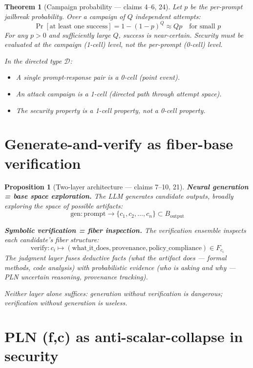 \documentclass[11pt,a4paper]{article}
\newtheorem{theorem}[definition]{Theorem}
\newtheorem{proposition}[definition]{Proposition}
\begin{document}
\begin{theorem}[Campaign probability --- claims 4--6, 24]
\label{thm:campaign}
Let $p$ be the per-prompt jailbreak probability. Over a campaign of $Q$
independent attempts:
\[
  \Pr[\text{at least one success}] = 1 - (1-p)^Q \approx Qp
  \quad \text{for small } p
\]
For any $p > 0$ and sufficiently large $Q$, success is near-certain.
Security must be evaluated at the campaign (1-cell) level, not the
per-prompt (0-cell) level.

In the directed type $\mathcal{D}$:
\begin{itemize}
  \item A single prompt-response pair is a 0-cell (point event).
  \item An attack campaign is a 1-cell (directed path through attempt space).
  \item The security property is a 1-cell property, not a 0-cell property.
\end{itemize}
\end{theorem}

\section{Generate-and-verify as fiber-base verification}

\begin{proposition}[Two-layer architecture --- claims 7--10, 21]
\label{prop:gen_verify}
\textbf{Neural generation = base space exploration.} The LLM generates
candidate outputs, broadly exploring the space of possible artifacts:
\[
  \text{gen}: \text{prompt} \to \{c_1, c_2, \ldots, c_n\} \subset
    B_{\text{output}}
\]

\textbf{Symbolic verification = fiber inspection.} The verification
ensemble inspects each candidate's fiber structure:
\[
  \text{verify}: c_i \mapsto (\text{what\_it\_does}, \text{provenance},
    \text{policy\_compliance}) \in F_{c_i}
\]
The judgment layer fuses deductive facts (what the artifact does ---
formal methods, code analysis) with probabilistic evidence (who is
asking and why --- PLN uncertain reasoning, provenance tracking).

Neither layer alone suffices: generation without verification is
dangerous; verification without generation is useless.
\end{proposition}

\section{PLN (f,c) as anti-scalar-collapse in security}
\end{document}
